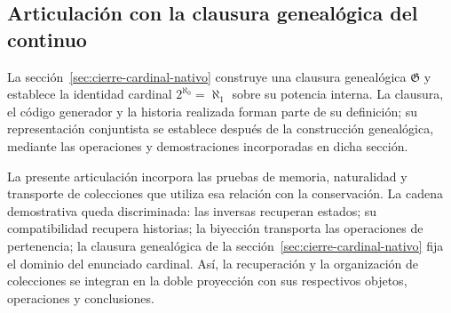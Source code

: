 \subsection{Articulación con la clausura genealógica del continuo}
La sección~\ref{sec:cierre-cardinal-nativo} construye una clausura
genealógica \(\mathfrak G\) y establece la identidad cardinal
\(2^{\aleph_0}=\aleph_1\) sobre su potencia interna. La clausura,
el código generador y la historia realizada forman parte de su
definición; su representación conjuntista se establece después de la
construcción genealógica, mediante las operaciones y demostraciones
incorporadas en dicha sección.

La presente articulación incorpora las pruebas de memoria,
naturalidad y transporte de colecciones que utiliza esa relación con
la conservación. La cadena demostrativa queda discriminada:
las inversas recuperan estados; su compatibilidad recupera
historias; la biyección transporta las operaciones de pertenencia;
la clausura genealógica de la sección~\ref{sec:cierre-cardinal-nativo} fija el dominio
del enunciado cardinal. Así, la recuperación y la organización
de colecciones se integran en la doble proyección con sus respectivos
objetos, operaciones y conclusiones.
